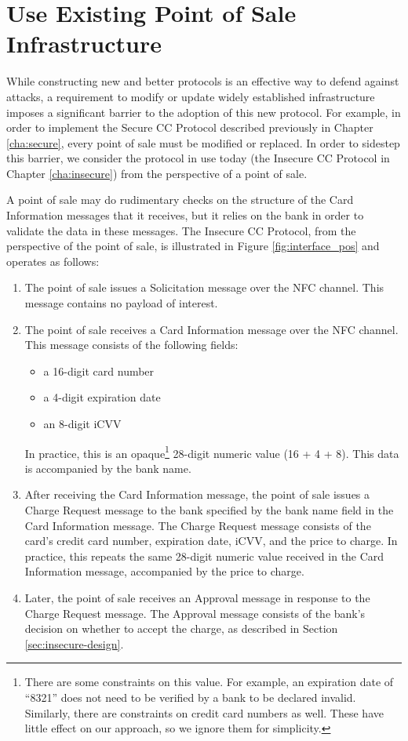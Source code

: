 \section{Use Existing Point of Sale Infrastructure}
\label{sec:goals-infrastructure}

While constructing new and better protocols is an effective way to defend against attacks,
	a requirement to modify or update widely established infrastructure imposes a significant barrier to the adoption of this new protocol.
For example, in order to implement the Secure CC Protocol described previously in Chapter \ref{cha:secure}, every point of sale must be modified or replaced.
In order to sidestep this barrier, we consider the protocol in use today (the Insecure CC Protocol in Chapter \ref{cha:insecure}) from the perspective of a point of sale.

A point of sale may do rudimentary checks on the structure of the Card Information messages that it receives,
	but it relies on the bank in order to validate the data in these messages.
The Insecure CC Protocol, from the perspective of the point of sale, is illustrated in Figure \ref{fig:interface_pos} and operates as follows:

\begin{enumerate}
\item The point of sale issues a Solicitation message over the NFC channel.
	This message contains no payload of interest.
\item The point of sale receives a Card Information message over the NFC channel.
	This message consists of the following fields:
	\begin{itemize}
	\item a 16-digit card number
	\item a 4-digit expiration date
	\item an 8-digit iCVV
	\end{itemize}
	In practice, this is an opaque\footnote{
        There are some constraints on this value.
        For example, an expiration date of ``8321'' does not need to be verified by a bank to be declared invalid.
        Similarly, there are constraints on credit card numbers as well.
        These have little effect on our approach, so we ignore them for simplicity.
    }
    28-digit numeric value (16 + 4 + 8).
    This data is accompanied by the bank name.
\item After receiving the Card Information message,
	the point of sale issues a Charge Request message to the bank specified by the bank name field in the Card Information message.
	The Charge Request message consists of the card's credit card number, expiration date, iCVV, and the price to charge.
	In practice, this repeats the same 28-digit numeric value received in the Card Information message, accompanied by the price to charge.
\item Later, the point of sale receives an Approval message in response to the Charge Request message.
	The Approval message consists of the bank's decision on whether to accept the charge, as described in Section \ref{sec:insecure-design}.
\end{enumerate}

